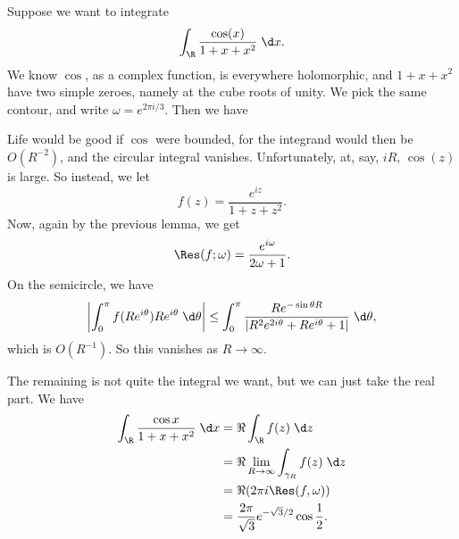 \documentclass[a4paper]{article}
\begin{document}
\begin{eg}
  Suppose we want to integrate
  \[
    \int_\R \frac{\cos (x)}{1 + x + x^2}\;\d x.
  \]
  We know $\cos$, as a complex function, is everywhere holomorphic, and $1 + x + x^2$ have two simple zeroes, namely at the cube roots of unity. We pick the same contour, and write $\omega = e^{2\pi i/3}$. Then we have
  \begin{center}
  \end{center}
  Life would be good if $\cos$ were bounded, for the integrand would then be $O(R^{-2})$, and the circular integral vanishes. Unfortunately, at, say, $iR$, $\cos(z)$ is large. So instead, we let
  \[
    f(z) = \frac{e^{iz}}{1 + z + z^2}.
  \]
  Now, again by the previous lemma, we get
  \[
    \Res(f; \omega) = \frac{e^{i\omega}}{2\omega + 1}.
  \]
  On the semicircle, we have
  \[
    \left|\int_0^\pi f(Re^{i\theta}) Re^{i\theta}\;\d \theta\right| \leq \int_0^\pi \frac{Re^{-\sin \theta R}}{|R^2 e^{2i \theta} + Re^{i\theta} + 1|} \;\d \theta,
  \]
  which is $O(R^{-1})$. So this vanishes as $R \to \infty$.

  The remaining is not quite the integral we want, but we can just take the real part. We have
  \begin{align*}
    \int_{\R} \frac{\cos x}{1 + x + x^2}\;\d x &= \Re \int_\R f(z)\;\d z\\
    &= \Re \lim_{R \to \infty} \int_{\gamma_R} f(z)\;\d z\\
    &= \Re (2\pi i \Res(f, \omega))\\
    &= \frac{2\pi}{\sqrt{3}} e^{-\sqrt{3}/2}\cos \frac{1}{2} .
  \end{align*}
\end{eg}
\end{document}
